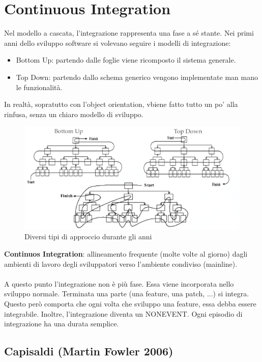 \section{Continuous Integration}

Nel modello a cascata, l'integrazione rappresenta una fase a sé stante. Nei primi anni dello sviluppo software si volevano seguire i modelli di integrazione:
\begin{itemize}
    \item Bottom Up: partendo dalle foglie viene ricomposto il sistema generale.
    \item Top Down: partendo dallo schema generico vengono implementate man mano le funzionalità.
\end{itemize}
In realtà, sopratutto con l’object orientation, vbiene fatto tutto un po’ alla rinfusa, senza un chiaro modello di sviluppo.
\begin{figure}[H]
	\centering
	 \includegraphics[width=\linewidth]{img/approcci.png}
	 \caption{Diversi tipi di approccio durante gli anni}
\end{figure}
\noindent \textbf{Continuos Integration}: allineamento frequente (molte volte al giorno) dagli ambienti di lavoro degli sviluppatori verso l’ambiente condiviso (mainline).
\\\\
A questo punto l'integrazione non è più fase. Essa viene incorporata nello sviluppo normale. Terminata una parte (una feature, una patch, ...) si integra. Questo però comporta che ogni volta che sviluppo una feature, essa debba essere integrabile. Inoltre, l'integrazione diventa un NONEVENT. Ogni episodio di integrazione ha una durata semplice.

\subsection{Capisaldi (Martin Fowler 2006)}

